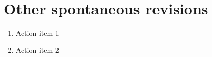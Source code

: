 \section*{Other spontaneous revisions}

\begin{enumerate}
  \item Action item 1
  \item Action item 2
\end{enumerate}
